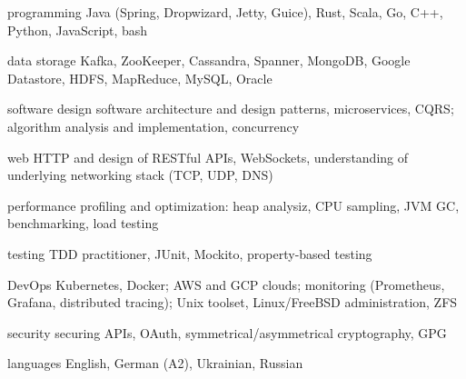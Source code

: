 

\begin{cvskills}

  \cvskill
    {programming} %
    {Java (Spring, Dropwizard, Jetty, Guice), Rust, Scala, Go, C++, Python, JavaScript, bash} %

  \cvskill
    {data storage} %
    {Kafka, ZooKeeper, Cassandra, Spanner, MongoDB, Google Datastore, HDFS, MapReduce, MySQL, Oracle} %

  \cvskill
    {software design} %
    {software architecture and design patterns, microservices, CQRS; algorithm analysis and implementation, concurrency} %

  \cvskill
    {web} %
    {HTTP and design of RESTful APIs, WebSockets, understanding of underlying networking stack (TCP, UDP, DNS)} %

  \cvskill
    {performance} %
    {profiling and optimization: heap analysiz, CPU sampling, JVM GC, benchmarking, load testing} %

  \cvskill
    {testing} %
    {TDD practitioner, JUnit, Mockito, property-based testing} %

  \cvskill
    {DevOps} %
    {Kubernetes, Docker; AWS and GCP clouds; monitoring (Prometheus, Grafana, distributed tracing); Unix toolset, Linux/FreeBSD administration, ZFS} %

  \cvskill
    {security} %
    {securing APIs, OAuth, symmetrical/asymmetrical cryptography, GPG} %

  \cvskill
    {languages} %
    {English, German (A2), Ukrainian, Russian} %

\end{cvskills}
